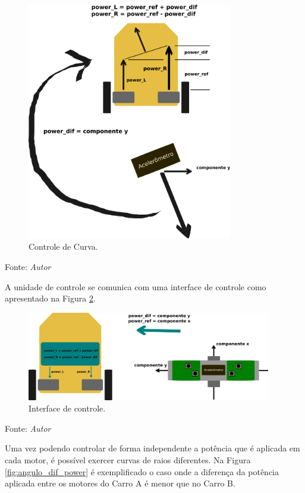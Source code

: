 \begin{figure}[!htb]
  \centering
  \caption{Controle de Curva.}
  \label{fig:controle_diferencial}
  \includegraphics[width=0.80\textwidth]{./img/concepcao/controle_diferencial.png}
\end{figure}
Fonte: \textit{Autor}

\pagebreak

A unidade de controle se comunica com uma interface de controle como apresentado na Figura \ref{fig:controle_para_atuador}.

\begin{figure}[!htb]
  \centering
  \caption{Interface de controle.}
  \label{fig:controle_para_atuador}
  \includegraphics[width=0.95\textwidth]{./img/concepcao/controle_para_atuador.png}
\end{figure}
Fonte: \textit{Autor}

Uma vez podendo controlar de forma independente a potência que é aplicada em cada motor, é possível exercer curvas de raios diferentes. 
Na Figura \ref{fig:angulo_dif_power} é exemplificado o caso onde a diferença da potência aplicada entre os motores do Carro A é menor que no Carro B.


